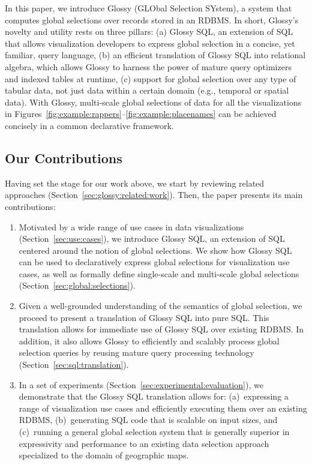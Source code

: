 \documentclass[11pt, oneside]{report}
\begin{document}
{In this paper, we introduce Glossy (GLObal Selection SYstem), a system that computes global selections over records stored in an RDBMS. In short, Glossy's novelty and utility rests on three pillars: (a) Glossy SQL, an extension of SQL that allows visualization developers to express global selection in a concise, yet familiar, query language, (b) an efficient translation of Glossy SQL into relational algebra, which allows Glossy to harness the power of mature query optimizers and indexed tables at runtime, (c) support for global selection over any type of tabular data, not just data within a certain domain (e.g., temporal or spatial data). With Glossy, multi-scale global selections of data for all the visualizations in Figures~\ref{fig:example:rappers}--\ref{fig:example:placenames} can be achieved concisely in a common declarative framework.  

\subsection{Our Contributions}

Having set the stage for our work above, we start by reviewing related approaches (Section~\ref{sec:glossy:related:work}). Then, the paper presents its main contributions:

\begin{enumerate}

\item Motivated by a wide range of use cases in data visualizations (Section~\ref{sec:use:cases}), we introduce Glossy SQL, an extension of SQL centered around the notion of global selections. We show how Glossy SQL can be used to declaratively express global selections for visualization use cases, as well as formally define single-scale and multi-scale global selections (Section~\ref{sec:global:selections}).  

\item Given a well-grounded understanding of the semantics of global selection, we proceed to present a translation of Glossy SQL into pure SQL. This translation allows for immediate use of Glossy SQL over existing RDBMS. In addition, it also allows Glossy to efficiently and scalably process global selection queries by reusing mature query processing technology (Section~\ref{sec:sql:translation}). 

\item In a set of experiments (Section~\ref{sec:experimental:evaluation}), we demonstrate that the Glossy SQL translation allows for: (a)~expressing a range of visualization use cases and efficiently executing them over an existing RDBMS, (b)~generating SQL code that is scalable on input sizes, and (c)~running a general global selection system that is generally superior in expressivity and performance to an existing data selection approach specialized to the domain of geographic maps. 


\end{enumerate}}
\end{document}

